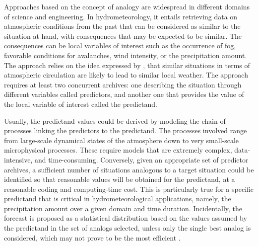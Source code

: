 \documentclass[gmd]{copernicus}
\begin{document}
\introduction  %

Approaches based on the concept of analogy are widespread in different domains of science and engineering. In hydrometeorology, it entails retrieving data on atmospheric conditions from the past that can be considered as similar to the situation at hand, with consequences that may be expected to be similar. The consequences can be local variables of interest such as the occurrence of fog, favorable conditions for avalanches, wind intensity, or the precipitation amount. The approach relies on the idea expressed by \citet{Lorenz1956, Lorenz1969}, that similar situations in terms of atmospheric circulation are likely to lead to similar local weather. The approach requires at least two concurrent archives: one describing the situation through different variables called predictors, and another one that provides the value of the local variable of interest called the predictand. 

Usually, the predictand values could be derived by modeling the chain of processes linking the predictors to the predictand. The processes involved range from large-scale dynamical states of the atmosphere down to very small-scale microphysical processes. These require models that are extremely complex, data-intensive, and time-consuming. Conversely, given an appropriate set of predictor archives, a sufficient number of situations analogous to a target situation could be identified so that reasonable values will be obtained for the predictand, at a reasonable coding and computing-time cost. This is particularly true for a specific predictand that is critical in hydrometeorological applications, namely, the precipitation amount over a given domain and time duration. Incidentally, the forecast is proposed as a statistical distribution based on the values assumed by the predictand in the set of analogs selected, unless only the single best analog is considered, which may not prove to be the most efficient \citep{Bontron2005}.
\end{document}
